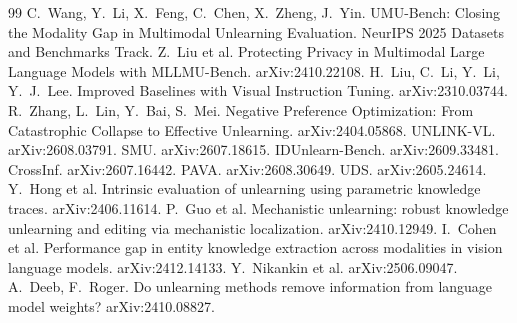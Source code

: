 \documentclass[11pt]{article}
\begin{document}
\begin{thebibliography}{99}\small
{} C.~Wang, Y.~Li, X.~Feng, C.~Chen, X.~Zheng, J.~Yin.
  UMU-Bench: Closing the Modality Gap in Multimodal Unlearning Evaluation. NeurIPS 2025 Datasets and Benchmarks Track.
 Z.~Liu et al. Protecting Privacy in Multimodal Large Language Models with MLLMU-Bench.
  arXiv:2410.22108. %
 H.~Liu, C.~Li, Y.~Li, Y.~J.~Lee. Improved Baselines with Visual Instruction Tuning. arXiv:2310.03744.
 R.~Zhang, L.~Lin, Y.~Bai, S.~Mei. Negative Preference Optimization: From Catastrophic Collapse to
  Effective Unlearning. arXiv:2404.05868.
 UNLINK-VL. arXiv:2608.03791. %
 SMU. arXiv:2607.18615. %
 IDUnlearn-Bench. arXiv:2609.33481. %
 CrossInf. arXiv:2607.16442. %
 PAVA. arXiv:2608.30649. %
 UDS. arXiv:2605.24614. %
 Y.~Hong et al. Intrinsic evaluation of unlearning using parametric knowledge traces.
  arXiv:2406.11614. %
 P.~Guo et al. Mechanistic unlearning: robust knowledge unlearning and editing via mechanistic
  localization. arXiv:2410.12949. %
 I.~Cohen et al. Performance gap in entity knowledge extraction across modalities in vision
  language models. arXiv:2412.14133. %
 Y.~Nikankin et al. arXiv:2506.09047. %
 A.~Deeb, F.~Roger. Do unlearning methods remove information from language model weights?
  arXiv:2410.08827. %
\end{thebibliography}
\end{document}
